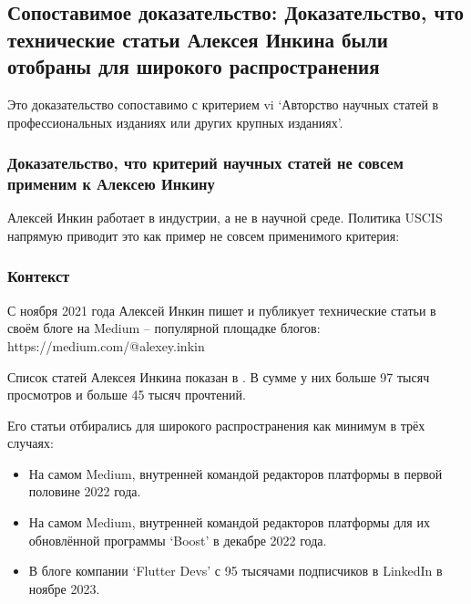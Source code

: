 \subsection{%
    Сопоставимое доказательство: Доказательство, что технические статьи Алексея Инкина были отобраны для широкого распространения%
}
\label{subsec:Articles}

Это доказательство сопоставимо с критерием vi
`Авторство научных статей в профессиональных изданиях или других крупных изданиях'.

\subsubsection{%
    Доказательство, что критерий научных статей не совсем применим к Алексею Инкину%
}

Алексей Инкин работает в индустрии, а не в научной среде.
Политика USCIS напрямую приводит это как пример не совсем применимого критерия:



\subsubsection{%
    Контекст
}

С ноября 2021 года Алексей Инкин пишет и публикует технические статьи в своём блоге на Medium
-- популярной площадке блогов:\\
https://medium.com/@alexey.inkin

Список статей Алексея Инкина показан в .
В сумме у них больше 97 тысяч просмотров и больше 45 тысяч прочтений.

Его статьи отбирались для широкого распространения как минимум в трёх случаях:

\begin{itemize}

    \item На самом Medium, внутренней командой редакторов платформы в первой половине 2022 года.

    \item На самом Medium, внутренней командой редакторов платформы для их обновлённой программы `Boost' в декабре 2022 года.

    \item В блоге компании `Flutter Devs' с 95 тысячами подписчиков в LinkedIn в ноябре 2023.

\end{itemize}

